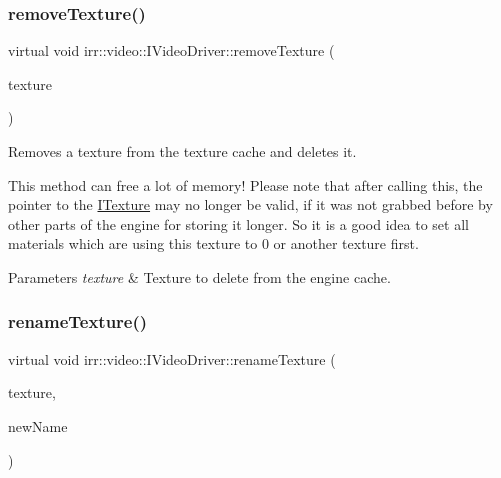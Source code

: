 \subsubsection{\texorpdfstring{remove\+Texture()}{removeTexture()}\hspace{0.1cm}{\footnotesize\ttfamily [2/2]}}
{\footnotesize\ttfamily virtual void irr\+::video\+::\+I\+Video\+Driver\+::remove\+Texture (\begin{DoxyParamCaption}\item[{\hyperlink{classirr_1_1video_1_1ITexture}{I\+Texture} $\ast$}]{texture }\end{DoxyParamCaption})\hspace{0.3cm}{\ttfamily [pure virtual]}}



Removes a texture from the texture cache and deletes it. 

This method can free a lot of memory! Please note that after calling this, the pointer to the \hyperlink{classirr_1_1video_1_1ITexture}{I\+Texture} may no longer be valid, if it was not grabbed before by other parts of the engine for storing it longer. So it is a good idea to set all materials which are using this texture to 0 or another texture first. 
\begin{DoxyParams}{Parameters}
{\em texture} & Texture to delete from the engine cache. \\
\hline
\end{DoxyParams}
\mbox{\label{classirr_1_1video_1_1IVideoDriver_a2cefddb9ebd7f46ee946c04b301a5c5b}} 
\subsubsection{\texorpdfstring{rename\+Texture()}{renameTexture()}\hspace{0.1cm}{\footnotesize\ttfamily [1/2]}}
{\footnotesize\ttfamily virtual void irr\+::video\+::\+I\+Video\+Driver\+::rename\+Texture (\begin{DoxyParamCaption}\item[{\hyperlink{classirr_1_1video_1_1ITexture}{I\+Texture} $\ast$}]{texture,  }\item[{const \hyperlink{namespaceirr_1_1io_a6468281622ce3a1c46b72e19f32dded5}{io\+::path} \&}]{new\+Name }\end{DoxyParamCaption})\hspace{0.3cm}{\ttfamily [pure virtual]}}



